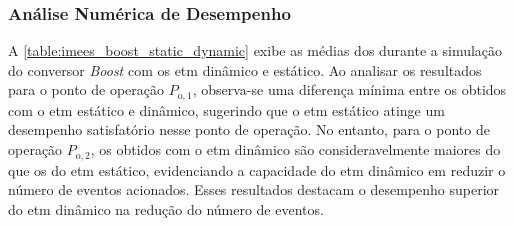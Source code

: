 \subsubsection{Análise Numérica de Desempenho}

A \autoref{table:imees_boost_static_dynamic} exibe as médias dos  durante a simulação do conversor \textit{Boost }com os \acrshort{etm} dinâmico e estático. Ao analisar os resultados para o ponto de operação $P_{\mathrm{o}, 1}$, observa-se uma diferença mínima entre os  obtidos com o \acrshort{etm} estático e dinâmico, sugerindo que o \acrshort{etm} estático atinge um desempenho satisfatório nesse ponto de operação. No entanto, para o ponto de operação $P_{\mathrm{o}, 2}$, os  obtidos com o \acrshort{etm} dinâmico são consideravelmente maiores do que os do \acrshort{etm} estático, evidenciando a capacidade do \acrshort{etm} dinâmico em reduzir o número de eventos acionados. Esses resultados destacam o desempenho superior do \acrshort{etm} dinâmico na redução do número de eventos.

